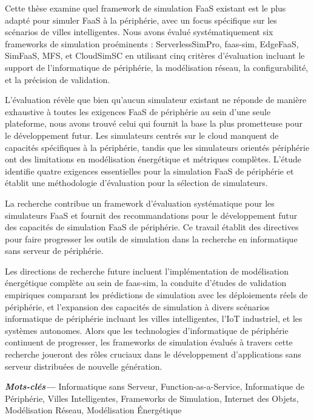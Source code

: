 Cette thèse examine quel framework de simulation FaaS existant est le plus adapté pour simuler FaaS à la périphérie, avec un focus spécifique sur les scénarios de villes intelligentes. Nous avons évalué systématiquement six frameworks de simulation proéminents : ServerlessSimPro, faas-sim, EdgeFaaS, SimFaaS, MFS, et CloudSimSC en utilisant cinq critères d'évaluation incluant le support de l'informatique de périphérie, la modélisation réseau, la configurabilité, et la précision de validation.

L'évaluation révèle que bien qu'aucun simulateur existant ne réponde de manière exhaustive à toutes les exigences FaaS de périphérie au sein d'une seule plateforme, nous avons trouvé celui qui fournit la base la plus prometteuse pour le développement futur. Les simulateurs centrés sur le cloud manquent de capacités spécifiques à la périphérie, tandis que les simulateurs orientés périphérie ont des limitations en modélisation énergétique et métriques complètes. L'étude identifie quatre exigences essentielles pour la simulation FaaS de périphérie et établit une méthodologie d'évaluation pour la sélection de simulateurs.

La recherche contribue un framework d'évaluation systématique pour les simulateurs FaaS et fournit des recommandations pour le développement futur des capacités de simulation FaaS de périphérie. Ce travail établit des directives pour faire progresser les outils de simulation dans la recherche en informatique sans serveur de périphérie.

Les directions de recherche future incluent l'implémentation de modélisation énergétique complète au sein de faas-sim, la conduite d'études de validation empiriques comparant les prédictions de simulation avec les déploiements réels de périphérie, et l'expansion des capacités de simulation à divers scénarios informatique de périphérie incluant les villes intelligentes, l'IoT industriel, et les systèmes autonomes. Alors que les technologies d'informatique de périphérie continuent de progresser, les frameworks de simulation évalués à travers cette recherche joueront des rôles cruciaux dans le développement d'applications sans serveur distribuées de nouvelle génération.

\providecommand{\keywordsfr}[1] {
  \small
  \textbf{\textit{Mots-clés---}} #1
}
\keywordsfr{Informatique sans Serveur, Function-as-a-Service, Informatique de Périphérie, Villes Intelligentes, Frameworks de Simulation, Internet des Objets, Modélisation Réseau, Modélisation Énergétique}

